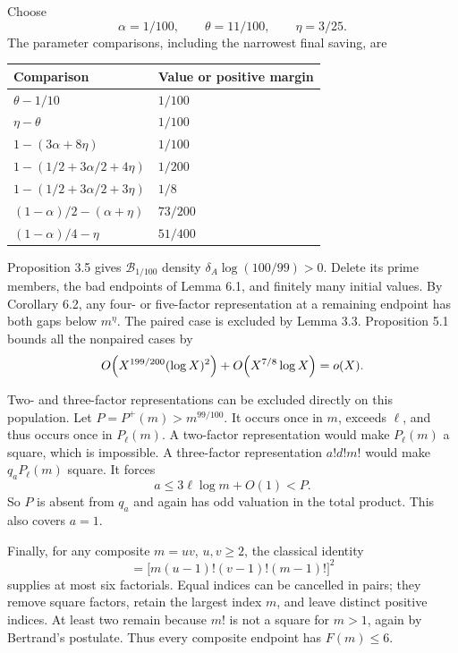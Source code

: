 \documentclass[letterpaper]{article}
\theoremstyle{definition}
\theoremstyle{remark}
\numberwithin{equation}{section}
\begin{document}
Choose
\[
  \alpha=1/100,\qquad \theta=11/100,\qquad \eta=3/25.
\]
The parameter comparisons, including the narrowest final saving, are
\begin{center}
\begin{tabular}{ll}
\toprule
Comparison & Value or positive margin\\
\midrule
$\theta-1/10$ & $1/100$\\
$\eta-\theta$ & $1/100$\\
$1-(3\alpha+8\eta)$ & $1/100$\\
$1-(1/2+3\alpha/2+4\eta)$ & $1/200$\\
$1-(1/2+3\alpha/2+3\eta)$ & $1/8$\\
$(1-\alpha)/2-(\alpha+\eta)$ & $73/200$\\
$(1-\alpha)/4-\eta$ & $51/400$\\
\bottomrule
\end{tabular}
\end{center}
Proposition 3.5 gives $\mathcal B_{1/100}$ density $\delta_A\log(100/99)>0$. Delete its prime members, the bad
endpoints of Lemma 6.1, and finitely many initial values. By Corollary 6.2, any four- or five-factor
representation at a remaining endpoint has both gaps below $m^\eta$. The paired case is excluded by
Lemma 3.3. Proposition 5.1 bounds all the nonpaired cases by
\begin{equation}
  O\Bigl(X^{199/200}(\log X)^2\Bigr)+O\Bigl(X^{7/8}\log X\Bigr)=o(X).
\end{equation}

Two- and three-factor representations can be excluded directly on this population. Let
$P=P^+(m)>m^{99/100}$. It occurs once in $m$, exceeds $\ell$, and thus occurs once in $P_\ell(m)$. A
two-factor representation would make $P_\ell(m)$ a square, which is impossible. A three-factor
representation $a!d!m!$ would make $q_aP_\ell(m)$ square. It forces
\[
  a\le 3\ell\log m+O(1)<P.
\]
So $P$ is absent from $q_a$ and again has odd valuation in the total product. This also covers $a=1$.

Finally, for any composite $m=uv$, $u,v\ge 2$, the classical identity
\begin{equation}
  [(u-1)!u!][(v-1)!v!][(m-1)!m!]=\bigl[m(u-1)!(v-1)!(m-1)!\bigr]^2
\end{equation}
supplies at most six factorials. Equal indices can be cancelled in pairs; they remove square
factors, retain the largest index $m$, and leave distinct positive indices. At least two remain
because $m!$ is not a square for $m>1$, again by Bertrand's postulate. Thus every composite
endpoint has $F(m)\le 6$.
\end{document}
